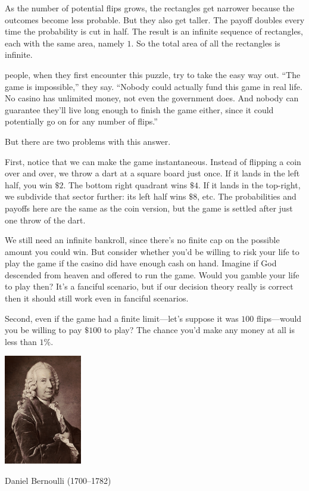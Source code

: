 \documentclass[justified]{tufte-book}
\theoremstyle{definition}
\theoremstyle{definition}
\theoremstyle{definition}
\theoremstyle{definition}
\theoremstyle{remark}
\begin{document}
As the number of potential flips grows, the rectangles get narrower because the outcomes become less probable. But they also get taller. The payoff doubles every time the probability is cut in half. The result is an infinite sequence of rectangles, each with the same area, namely \(1\). So the total area of all the rectangles is infinite.

 people, when they first encounter this puzzle, try to take the easy way out. ``The game is impossible,'' they say. ``Nobody could actually fund this game in real life. No casino has unlimited money, not even the government does. And nobody can guarantee they'll live long enough to finish the game either, since it could potentially go on for any number of flips.''

But there are two problems with this answer.

First, notice that we can make the game instantaneous. Instead of flipping a coin over and over, we throw a dart at a square board just once. If it lands in the left half, you win \(\$2\). The bottom right quadrant wins \(\$4\). If it lands in the top-right, we subdivide that sector further: its left half wins \(\$8\), etc. The probabilities and payoffs here are the same as the coin version, but the game is settled after just one throw of the dart.

We still need an infinite bankroll, since there's no finite cap on the possible amount you could win. But consider whether you'd be willing to risk your life to play the game if the casino did have enough cash on hand. Imagine if God descended from heaven and offered to run the game. Would you gamble your life to play then? It's a fanciful scenario, but if our decision theory really is correct then it should still work even in fanciful scenarios.

Second, even if the game had a finite limit---let's suppose it was \(100\) flips---would you be willing to pay \(\$100\) to play? The chance you'd make any money at all is less than \(1\%\).

\begin{marginfigure}
\includegraphics[width=1.33in]{img/daniel_bernoulli} \caption[Daniel Bernoulli (1700--1782)]{Daniel Bernoulli (1700--1782)}\label{fig:bernoulli}
\end{marginfigure}
\end{document}
